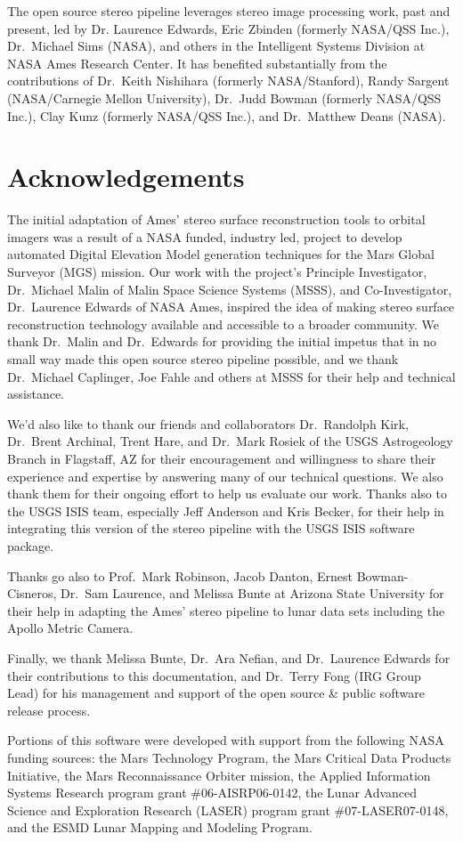 The open source stereo pipeline leverages stereo image processing
work, past and present, led by Dr. Laurence Edwards, Eric Zbinden
(formerly NASA/QSS Inc.), Dr.~Michael Sims (NASA), and others in the
Intelligent Systems Division at NASA Ames Research Center. It has
benefited substantially from the contributions of Dr.~Keith Nishihara
(formerly NASA/Stanford), Randy Sargent (NASA/Carnegie Mellon
University), Dr.~Judd Bowman (formerly NASA/QSS Inc.), Clay Kunz
(formerly NASA/QSS Inc.), and Dr.~Matthew Deans (NASA).

\section*{Acknowledgements}

The initial adaptation of Ames' stereo surface reconstruction tools to
orbital imagers was a result of a NASA funded, industry led, project
to develop automated Digital Elevation Model generation techniques for
the Mars Global Surveyor (MGS) mission. Our work with the project's
Principle Investigator, Dr.~Michael Malin of Malin Space Science
Systems (MSSS), and Co-Investigator, Dr.~Laurence Edwards of NASA
Ames, inspired the idea of making stereo surface reconstruction
technology available and accessible to a broader community.  We thank
Dr.~Malin and Dr.~Edwards for providing the initial impetus that in no
small way made this open source stereo pipeline possible, and we thank
Dr.~Michael Caplinger, Joe Fahle and others at MSSS for their help and
technical assistance.

We'd also like to thank our friends and collaborators Dr.~Randolph
Kirk, Dr.~Brent Archinal, Trent Hare, and Dr.~Mark Rosiek of the USGS
Astrogeology Branch in Flagstaff, AZ for their encouragement and
willingness to share their experience and expertise by answering many
of our technical questions.  We also thank them for their ongoing
effort to help us evaluate our work.  Thanks also to the USGS ISIS
team, especially Jeff Anderson and Kris Becker, for their help in
integrating this version of the stereo pipeline with the USGS ISIS
software package.

Thanks go also to Prof.~Mark Robinson, Jacob Danton, Ernest
Bowman-Cisneros, Dr.~Sam Laurence, and Melissa Bunte at Arizona State
University for their help in adapting the Ames' stereo pipeline to
lunar data sets including the Apollo Metric Camera.

Finally, we thank Melissa Bunte, Dr.~Ara Nefian, and Dr.~Laurence
Edwards for their contributions to this documentation, and Dr.~Terry
Fong (IRG Group Lead) for his management and support of the open
source \& public software release process.

Portions of this software were developed with support from the
following NASA funding sources: the Mars Technology Program, the Mars
Critical Data Products Initiative, the Mars Reconnaissance Orbiter
mission, the Applied Information Systems Research program grant
\#06-AISRP06-0142, the Lunar Advanced Science and Exploration Research
(LASER) program grant \#07-LASER07-0148, and the ESMD Lunar Mapping and
Modeling Program.
